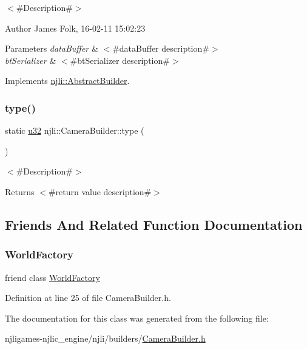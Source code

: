 $<$\#\+Description\#$>$ 

\begin{DoxyAuthor}{Author}
James Folk, 16-\/02-\/11 15\+:02\+:23
\end{DoxyAuthor}

\begin{DoxyParams}{Parameters}
{\em data\+Buffer} & $<$\#data\+Buffer description\#$>$ \\
\hline
{\em bt\+Serializer} & $<$\#bt\+Serializer description\#$>$ \\
\hline
\end{DoxyParams}


Implements \mbox{\hyperlink{classnjli_1_1_abstract_builder_ab66b774e02ccb9da554c9aab7fa6d981}{njli\+::\+Abstract\+Builder}}.

\mbox{\label{classnjli_1_1_camera_builder_a3745618af153d80fd6b291de25629888}} 
\subsubsection{\texorpdfstring{type()}{type()}}
{\footnotesize\ttfamily static \mbox{\hyperlink{_util_8h_a10e94b422ef0c20dcdec20d31a1f5049}{u32}} njli\+::\+Camera\+Builder\+::type (\begin{DoxyParamCaption}{ }\end{DoxyParamCaption})\hspace{0.3cm}{\ttfamily [static]}}

$<$\#\+Description\#$>$

\begin{DoxyReturn}{Returns}
$<$\#return value description\#$>$ 
\end{DoxyReturn}


\subsection{Friends And Related Function Documentation}
\mbox{\label{classnjli_1_1_camera_builder_acb96ebb09abe8f2a37a915a842babfac}} 
\subsubsection{\texorpdfstring{World\+Factory}{WorldFactory}}
{\footnotesize\ttfamily friend class \mbox{\hyperlink{classnjli_1_1_world_factory}{World\+Factory}}\hspace{0.3cm}{\ttfamily [friend]}}



Definition at line 25 of file Camera\+Builder.\+h.



The documentation for this class was generated from the following file\+:\begin{DoxyCompactItemize}
\item 
njligames-\/njlic\+\_\+engine/njli/builders/\mbox{\hyperlink{_camera_builder_8h}{Camera\+Builder.\+h}}\end{DoxyCompactItemize}

